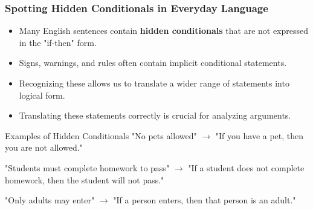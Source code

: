 \documentclass{beamer}
\begin{document}
            \begin{frame}
                \frametitle{Spotting Hidden Conditionals in Everyday Language}
                \begin{itemize}
                    \item Many English sentences contain \textbf{hidden conditionals} that are not expressed in the "if-then" form.
                    \item Signs, warnings, and rules often contain implicit conditional statements.
                    \item Recognizing these allows us to translate a wider range of statements into logical form.
                    \item Translating these statements correctly is crucial for analyzing arguments.
                \end{itemize}
                
                \begin{alertblock}{Examples of Hidden Conditionals}
                "No pets allowed" $\rightarrow$ "If you have a pet, then you are not allowed."
                
                "Students must complete homework to pass" $\rightarrow$ "If a student does not complete homework, then the student will not pass."
                
                "Only adults may enter" $\rightarrow$ "If a person enters, then that person is an adult."
                \end{alertblock}
                \end{frame}
                
\end{document}
